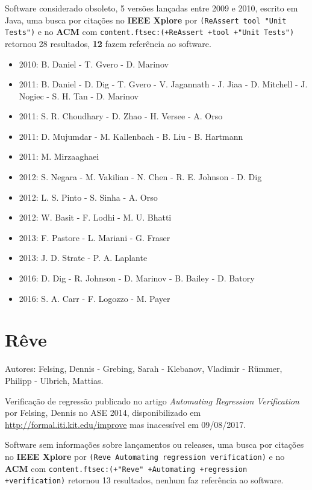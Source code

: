 Software considerado obsoleto,
5 versões lançadas
entre 2009 e 2010,
escrito em Java,
uma busca por citações no {\bf IEEE Xplore} por
\texttt{(ReAssert tool "Unit Tests")}
e no {\bf ACM} com
\texttt{content.ftsec:(+ReAssert +tool +"Unit Tests")}
retornou
28 resultados,
{\bf 12} fazem referência ao software.

\begin{itemize}
\item 2010: B. Daniel - T. Gvero - D. Marinov
\item 2011: B. Daniel - D. Dig - T. Gvero - V. Jagannath - J. Jiaa - D. Mitchell - J. Nogiec - S. H. Tan - D. Marinov
\item 2011: S. R. Choudhary - D. Zhao - H. Versee - A. Orso
\item 2011: D. Mujumdar - M. Kallenbach - B. Liu - B. Hartmann
\item 2011: M. Mirzaaghaei
\item 2012: S. Negara - M. Vakilian - N. Chen - R. E. Johnson - D. Dig
\item 2012: L. S. Pinto - S. Sinha - A. Orso
\item 2012: W. Basit - F. Lodhi - M. U. Bhatti
\item 2013: F. Pastore - L. Mariani - G. Fraser
\item 2013: J. D. Strate - P. A. Laplante
\item 2016: D. Dig - R. Johnson - D. Marinov - B. Bailey - D. Batory
\item 2016: S. A. Carr - F. Logozzo - M. Payer
\end{itemize}

\section{Rêve}

Autores:
Felsing, Dennis - Grebing, Sarah - Klebanov, Vladimir - R\"{u}mmer, Philipp - Ulbrich, Mattias.

Verificação de regressão
publicado no artigo {\it Automating Regression Verification}
por Felsing, Dennis
no ASE 2014,
disponibilizado em \url{http://formal.iti.kit.edu/improve}
mas inacessível em 09/08/2017.

Software sem informações sobre lançamentos ou releases,
uma busca por citações no {\bf IEEE Xplore} por
\texttt{(Reve Automating regression verification)}
e no {\bf ACM} com
\texttt{content.ftsec:(+"Reve" +Automating +regression +verification)}
retornou
13 resultados,
nenhum faz referência ao software.


